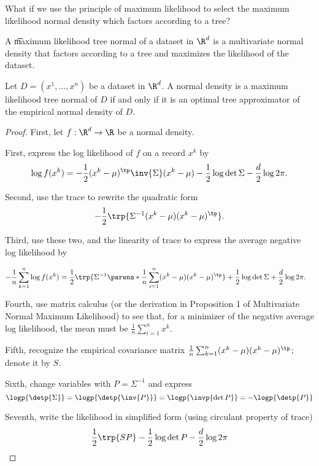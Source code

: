 What if we use the principle of maximum likelihood to select the maximum likelihood normal density which factors according to a tree?


A \t{maximum likelihood tree normal} of a dataset in $\R^d$ is a multivariate normal density that factors according to a tree and maximizes the likelihood of the dataset.


\begin{prop}

Let $D = (x^1, \dots, x^n)$ be a dataset in $\R^d$.
A normal density is a maximum likelihood tree normal of $D$ if and only if it is an optimal tree approximator of the empirical normal density of $D$.

\begin{proof}

First, let $f: \R^d \to \R$ be a normal density.

First, express the log likelihood of $f$ on a record $x^k$ by
$$
  \log f(x^k) = - \frac{1}{2} (x^k - \mu)^{\tp} \inv{\Sigma} (x^k - \mu) - \frac{1}{2} \log \det \Sigma - \frac{d}{2}\log 2\pi.
$$

Second, use the trace to rewrite the quadratic form
$$
  -\frac{1}{2}\trp{\Sigma^{-1} (x^k - \mu) (x^k - \mu)^{\tp}}.
$$

Third, use these two, and the linearity of trace to express the average negative log likelihood by

$$
  \begin{aligned}
    - \frac{1}{n} \sum_{k = 1}^{n} \log f(x^k) &= \frac{1}{2} \trp{\Sigma^{-1}\parens*{\frac{1}{n}\sum_{i = 1}^{n} (x^k - \mu)(x^k - \mu)^{\tp}}} + \frac{1}{2}\log\det\Sigma + \frac{d}{2}\log 2\pi.
  \end{aligned}
$$

  Fourth, use matrix calculus (or the derivation in Proposition 1 of Multivariate Normal Maximum Likelihood) to see that, for a minimizer of the negative average log likelihood, the mean must be $\frac{1}{n} \sum_{i = 1}^{n} x^k$.

  Fifth, recognize the empirical covariance matrix $\frac{1}{n}\sum_{k = 1}^{n} (x^k - \mu)(x^k - \mu)^{\tp}$; denote it by $S$.

Sixth, change variables with $P = \Sigma^{-1}$ and express
$$
  \logp{\detp{\Sigma}} = \logp{\detp{\inv{P}}} = \logp{\invp{\det P}} = -\logp{\detp{P}}
$$

  Seventh, write the likelihood in simplified form (using circulant property of trace)
$$
  \frac{1}{2} \trp{SP} - \frac{1}{2} \log \det P - \frac{d}{2}\log 2\pi
$$


\end{proof}
\end{prop}
